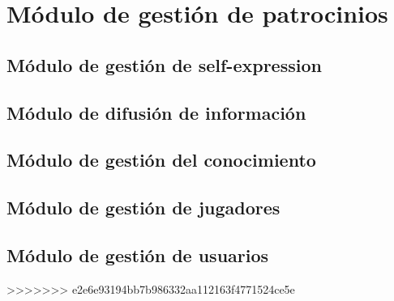 \section{Módulo de gestión de patrocinios}


\clearpage

\subsection{Módulo de gestión de self-expression}


\subsection{Módulo de difusión de información}


\subsection{Módulo de gestión del conocimiento}


\subsection{Módulo de gestión de jugadores}


\subsection{Módulo de gestión de usuarios}

>>>>>>> e2e6e93194bb7b986332aa112163f4771524ce5e
